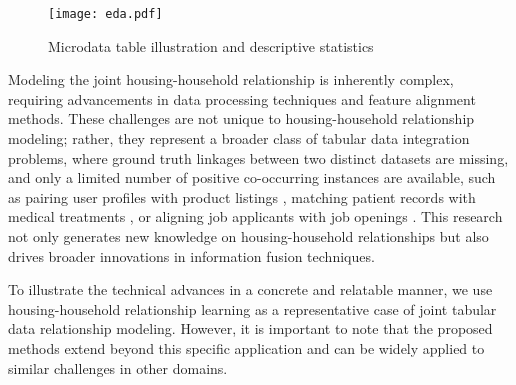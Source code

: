 \documentclass[]{nature_mod}
\begin{document}
\begin{figure}[!ht]
    \centering
    \texttt{[image: eda.pdf]}
    \caption{Microdata table illustration and descriptive statistics}
    \label{fig:desriptive_stats}
\end{figure}

Modeling the joint housing-household relationship is inherently complex, requiring advancements in data processing techniques and feature alignment methods. These challenges are not unique to housing-household relationship modeling; rather, they represent a broader class of tabular data integration problems, where ground truth linkages between two distinct datasets are missing, and only a limited number of positive co-occurring instances are available, such as pairing user profiles with product listings \cite{mcauley2015inferring}, matching patient records with medical treatments \cite{hripcsak2013next}, or aligning job applicants with job openings \cite{malinowski2006matching}. This research not only generates new knowledge on housing-household relationships but also drives broader innovations in information fusion techniques. 

To illustrate the technical advances in a concrete and relatable manner, we use housing-household relationship learning as a representative case of joint tabular data relationship modeling. However, it is important to note that the proposed methods extend beyond this specific application and can be widely applied to similar challenges in other domains.
\end{document}
